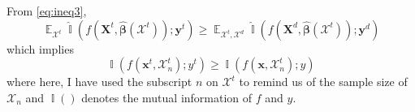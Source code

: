 \documentclass[12pt]{article}
\DeclareMathOperator{\E}{\mathbb{E}}
\DeclareMathOperator{\I}{\mathbb{I}}
\begin{document}
	From \eqref{eq:ineq3}, 
	\begin{equation}
	\E_{\mathcal{X}^t} \hat{\I} (f(\boldsymbol{X}^t, \hat{\boldsymbol{\beta}}(\mathcal{X}^t)); \boldsymbol{y}^t) \geq \E_{\mathcal{X}^t, \mathcal{X}^d} \hat{\I} (f(\boldsymbol{X}^d, \hat{\boldsymbol{\beta}}(\mathcal{X}^t)); \boldsymbol{y}^d)
	\end{equation}	
	which implies 
	\begin{equation}
		\I(f(\boldsymbol{x}^t, \mathcal{X}_n^t); y^t) \geq \I(f(\boldsymbol{x}, \mathcal{X}_n^t); y)
	\end{equation}
	where here, I have used the subscript $n$ on $\mathcal{X}^t$ to remind us of the sample size of $\mathcal{X}_n$ and $\I()$ denotes the mutual information of $f$ and $y$. 
	
	
%	
	
	
	
\end{document}
